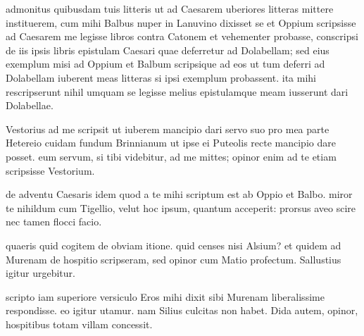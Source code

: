 


 admonitus quibusdam tuis litteris ut ad Caesarem uberiores litteras mittere instituerem, cum mihi Balbus nuper in Lanuvino dixisset se et Oppium scripsisse ad Caesarem me legisse libros contra Catonem et vehementer probasse, conscripsi de iis ipsis libris epistulam Caesari quae deferretur ad Dolabellam; sed eius exemplum misi ad Oppium et Balbum scripsique ad eos ut tum deferri ad Dolabellam iuberent meas litteras si ipsi exemplum probassent. ita mihi rescripserunt nihil umquam se legisse melius epistulamque meam iusserunt dari Dolabellae.

 Vestorius ad me scripsit ut iuberem mancipio dari servo suo pro mea parte Hetereio cuidam fundum Brinnianum ut ipse ei Puteolis recte mancipio dare posset. eum servum, si tibi videbitur, ad me mittes; opinor enim ad te etiam scripsisse Vestorium.

 de adventu Caesaris idem quod a te mihi scriptum est ab Oppio et Balbo. miror te nihildum cum Tigellio, velut hoc ipsum, quantum acceperit: prorsus aveo scire nec tamen flocci facio.

 quaeris quid cogitem de obviam itione. quid censes nisi Alsium? et quidem ad Murenam de hospitio scripseram, sed opinor cum Matio profectum. Sallustius igitur urgebitur.

 scripto iam superiore versiculo Eros mihi dixit sibi Murenam liberalissime respondisse. eo igitur utamur. nam Silius culcitas non habet. Dida autem, opinor, hospitibus totam villam concessit.
